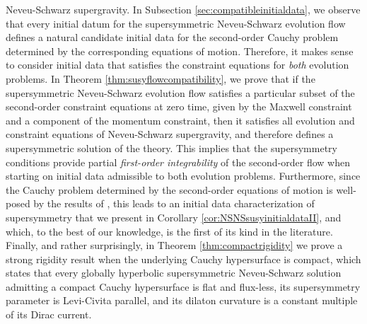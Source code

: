 \documentclass[10pt,reqno,a4paper]{amsart}
\theoremstyle{plain}
\theoremstyle{definition}
\theoremstyle{remark}
\theoremstyle{remark}
\renewcommand{\(}{ (}
\renewcommand{\)}{ )}
\begin{document}
Neveu-Schwarz supergravity. In Subsection \ref{sec:compatibleinitialdata}, we observe that every initial datum for the supersymmetric Neveu-Schwarz evolution flow defines a natural candidate initial data for the second-order Cauchy problem determined by the corresponding equations of motion. Therefore, it makes sense to consider initial data that satisfies the constraint equations for \emph{both} evolution problems. In Theorem \ref{thm:susyflowcompatibility}, we prove that if the supersymmetric Neveu-Schwarz evolution flow satisfies a particular subset of the second-order constraint equations at zero time, given by the Maxwell constraint and a component of the momentum constraint, then it satisfies all evolution and constraint equations of Neveu-Schwarz supergravity, and therefore defines a supersymmetric solution of the theory. This implies that the supersymmetry conditions provide partial \emph{first-order integrability} of the second-order flow when starting on initial data admissible to both evolution problems. Furthermore, since the Cauchy problem determined by the second-order equations of motion is well-posed by the results of \cite{Schiller:2026vls}, this leads to an initial data characterization of supersymmetry that we present in Corollary \ref{cor:NSNSsusyinitialdataII}, and which, to the best of our knowledge, is the first of its kind in the literature. Finally, and rather surprisingly, in Theorem \ref{thm:compactrigidity} we prove a strong rigidity result when the underlying Cauchy hypersurface is compact, which states that every globally hyperbolic supersymmetric Neveu-Schwarz solution admitting a compact Cauchy hypersurface is flat and flux-less, its supersymmetry parameter is Levi-Civita parallel, and its dilaton curvature is a constant multiple of its Dirac current. \medskip
\end{document}
